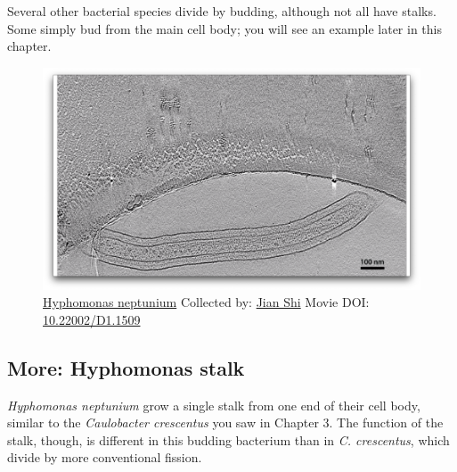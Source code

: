 \documentclass[]{tufte-book}
\begin{document}
Several other bacterial species divide by budding, although not all have
stalks. Some simply bud from the main cell body; you will see an example
later in this chapter.





\begin{figure}
\includegraphics{movie_stills/5_3} \caption[\protect\hyperlink{tree}{Hyphomonas neptunium} Collected by:
\protect\hyperlink{jian_shi}{Jian Shi} Movie DOI:
\href{https://doi.org/10.22002/D1.1509}{10.22002/D1.1509}]{\protect\hyperlink{tree}{Hyphomonas neptunium} Collected by:
\protect\hyperlink{jian_shi}{Jian Shi} Movie DOI:
\href{https://doi.org/10.22002/D1.1509}{10.22002/D1.1509}}\label{fig:5-3}
\end{figure}

\hypertarget{Hyphomonas_stalk}{\subsection*{More: Hyphomonas
stalk}\label{Hyphomonas_stalk}}

\emph{Hyphomonas neptunium} grow a single stalk from one end of their
cell body, similar to the \emph{Caulobacter crescentus} you saw in
Chapter 3. The function of the stalk, though, is different in this
budding bacterium than in \emph{C. crescentus}, which divide by more
conventional fission.
\end{document}
